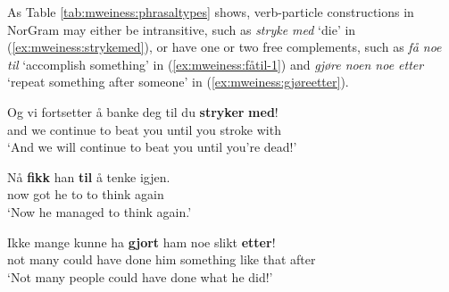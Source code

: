 \documentclass[output=paper]{langsci/langscibook}
\begin{document}
 As Table \ref{tab:mweiness:phrasaltypes} shows, verb-particle constructions in NorGram may either be intransitive, such as \emph{stryke med} `die' in (\ref{ex:mweiness:strykemed}), or have one or two free complements, such as \emph{få noe til} `accomplish something' in (\ref{ex:mweiness:fåtil-1}) and \emph{gjøre noen noe etter} `repeat something after someone' in (\ref{ex:mweiness:gjøreetter}).


\ea\label{ex:mweiness:strykemed}
\gll Og vi fortsetter å banke deg til du \textbf{stryker} \textbf{med}! \\ 
 and we continue to beat you until you stroke with \\
\glt `And we will continue to beat you until you're dead!' \\ 
\z

\ea\label{ex:mweiness:fåtil-1}
\gll Nå \textbf{fikk} han \textbf{til} å tenke igjen. \\
 now got he to to think again \\
\glt `Now he managed to think again.' \\
\z

%
\ea\label{ex:mweiness:gjøreetter}
\gll Ikke mange kunne ha \textbf{gjort} ham noe slikt \textbf{etter}! \\ 
  not many could have done him something {like that} after \\
\glt `Not many people could have done what he did!' \\ 
\z
\end{document}
